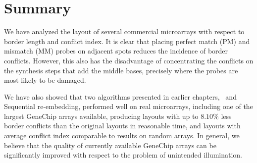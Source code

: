 \section{Summary}
\label{sec:affy_summary}

We have analyzed the layout of several commercial microarrays with respect to
border length and conflict index. It is clear that placing perfect match (PM)
and mismatch (MM) probes on adjacent spots reduces the incidence of border
conflicts. However, this also has the disadvantage of concentrating the
conflicts on the synthesis steps that add the middle bases, precisely where the
probes are most likely to be damaged.

We have also showed that two algorithms presented in earlier chapters,
\Greedyplus\ and Sequential re-embedding, performed well on real microarrays,
including one of the largest GeneChip arrays available, producing layouts with
up to $8.10\%$ less border conflicts than the original layouts in reasonable
time, and layouts with average conflict index comparable to results on random
arrays. In general, we believe that the quality of currently available GeneChip
arrays can be significantly improved with respect to the problem of unintended
illumination.
